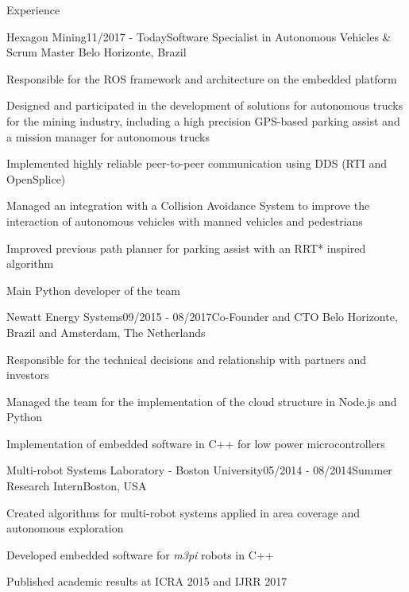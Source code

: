 \documentclass[14pt, a4paper]{resume} %
\begin{document}
\begin{rSection}{Experience}


\begin{rSubsection}{Hexagon Mining}{11/2017 - Today}{\normalfont Software Specialist in Autonomous Vehicles \& Scrum Master}{ \normalfont Belo Horizonte, Brazil}
 	\item Responsible for the ROS framework and architecture on the embedded platform
 	\item Designed and participated in the development of solutions for autonomous trucks for the mining industry, including a high precision GPS-based parking assist and a mission manager for autonomous trucks
 	\item Implemented highly reliable peer-to-peer communication using DDS (RTI and OpenSplice)
 	\item Managed an integration with a Collision Avoidance System to improve the interaction of autonomous vehicles with manned vehicles and pedestrians
 	\item Improved previous path planner for parking assist with an RRT* inspired algorithm
 	\item Main Python developer of the team
\end{rSubsection}

\begin{rSubsection}{Newatt Energy Systems}{09/2015 - 08/2017}{\normalfont Co-Founder and CTO}{ \normalfont Belo Horizonte, Brazil and Amsterdam, The Netherlands}
 	\item Responsible for the technical decisions and relationship with partners and investors
 	\item Managed the team for the implementation of the cloud structure in Node.js and Python
 	\item Implementation of embedded software in C++ for low power microcontrollers
\end{rSubsection}

\begin{rSubsection}{Multi-robot Systems Laboratory - Boston University}{05/2014 - 08/2014}{\normalfont Summer Research Intern}{\normalfont Boston,  USA}
	\item Created algorithms for multi-robot systems applied in area coverage and autonomous exploration
	\item Developed embedded software for \textit{m3pi} robots in C++
	\item Published academic results at ICRA 2015 and IJRR 2017
\end{rSubsection}



\end{rSection}
\end{document}
